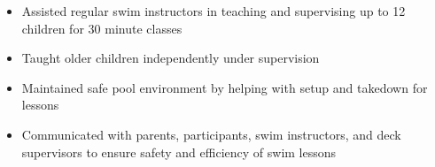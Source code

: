 \documentclass[a4paper,10pt]{article}
\begin{document}
\begin{itemize}[nosep,after=\strut, leftmargin=1em, itemsep=3pt,label=--]
  \item Assisted regular swim instructors in teaching and supervising up to 12 children for 30 minute classes
\item Taught older children independently under supervision
\item Maintained safe pool environment by helping with setup and takedown for lessons
\item Communicated with parents, participants, swim instructors, and deck supervisors to ensure safety and efficiency of swim lessons
\end{itemize}
\end{document}
